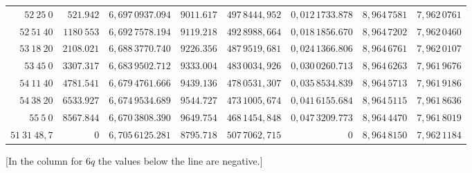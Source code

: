 \begin{center}
\begin{tabular}{|r|r|r|r|r|r|r|r|}
$52\ 25\ 0$&$521.942$&$6{,}697\,0937.094$&$9011.617$&$497\,8444{,}952$&$0{,}012\,1733.878$&$8{,}964\,7581$&$7{,}962\,0761$\\
$52\ 51\ 40$&$1180\ 553$&$6{,}692\,7578.194$&$9119.218$&$492\,8988{,}664$&$0{,}018\,1856.670$&$8{,}964\,7202$&$7{,}962\,0460$\\
$53\ 18\ 20$&$2108.021$&$6{,}688\,3770.740$&$9226.356$&$487\,9519{,}681$&$0{,}024\,1366.806$&$8{,}964\,6761$&$7{,}962\,0107$\\
$53\ 45\ 0$&$3307.317$&$6{,}683\,9502.712$&$9333.004$&$483\,0034{,}926$&$0{,}030\,0260.713$&$8{,}964\,6263$&$7{,}961\,9676$\\
$54\ 11\ 40$&$4781.541$&$6{,}679\,4761.666$&$9439.136$&$478\,0531{,}307$&$0{,}035\,8534.839$&$8{,}964\,5713$&$7{,}961\,9186$\\
$54\ 38\ 20$&$6533.927$&$6{,}674\,9534.689$&$9544.727$&$473\,1005{,}674$&$0{,}041\,6155.684$&$8{,}964\,5115$&$7{,}961\,8636$\\
$55\ 5\ 0$&$8567.844$&$6{,}670\,3808.390$&$9649.754$&$468\,1454{,}848$&$0{,}047\,3209.773$&$8{,}964\,4470$&$7{,}961\,8019$\\[8pt]
$51\ 31\ 48{,}7$&$0$&$6{,}705\,6125.281$&$8795.718$&$507\,7062{,}715$&$0$&$8{,}964\,8150$&$7{,}962\,1184$\\
\end{tabular}\par\endgroup
\end{center}
\noindent{}[In the column for $6q$ the values below the line are negative.]
\vspace{12mm}
